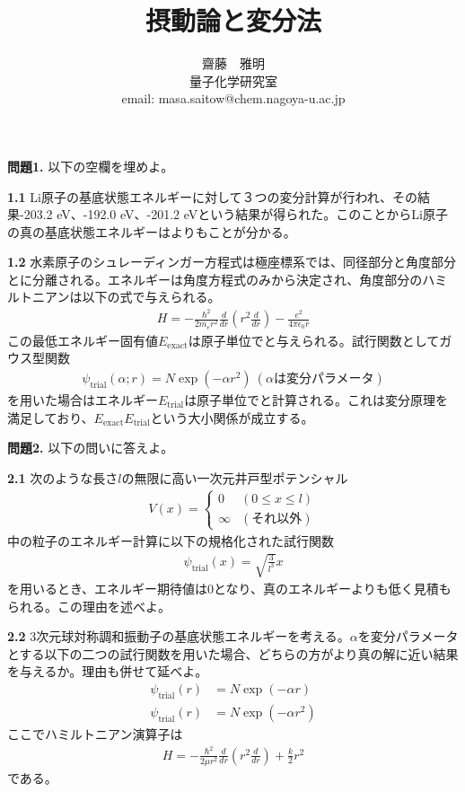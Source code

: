 \documentclass[11pt,pra,aps]{revtex4}
\newcommand{\boxz}[1]{\boxed{\phantom{\text{#1}}}}
\begin{document}
\title{摂動論と変分法}
\author{齋藤　雅明 \\ 量子化学研究室 \\ email: masa.saitow@chem.nagoya-u.ac.jp}

\maketitle

\noindent
{\bf 問題1.} 以下の空欄を埋めよ。

\noindent
{\bf 1.1} Li原子の基底状態エネルギーに対して３つの変分計算が行われ、その結果-203.2 eV、-192.0 eV、-201.2 eVという結果が得られた。このことからLi原子の真の基底状態エネルギーは\boxz{-203.2 eV}よりも\boxz{低い}ことが分かる。

\noindent
{\bf 1.2} 水素原子のシュレーディンガー方程式は極座標系では、同径部分と角度部分とに分離される。エネルギーは角度方程式のみから決定され、角度部分のハミルトニアンは以下の式で与えられる。
\begin{align}
  H = -\frac{\hbar^2}{2m_e r^2}\frac{d}{dr}\left(r^2\frac{d}{dr}\right)-\frac{e^2}{4\pi\epsilon_0 r}
\end{align}
この最低エネルギー固有値$E_\text{exact}$は原子単位で\boxz{-0.5}と与えられる。試行関数としてガウス型関数
\begin{align}
  \psi_\text{trial}(\alpha;r)=N\exp\left(-\alpha r^2\right) \ (\alpha\text{は変分パラメータ})
\end{align}
を用いた場合はエネルギー$E_\text{trial}$は原子単位で\boxz{}と計算される。これは変分原理を満足しており、$E_\text{exact}$\boxz{$\leq$}$E_\text{trial}$という大小関係が成立する。

\noindent
{\bf 問題2.} 以下の問いに答えよ。

\noindent
{\bf 2.1} 次のような長さ$l$の無限に高い一次元井戸型ポテンシャル
\begin{align}
  V(x)=\left\{
  \begin{array}{cc}
    0 & (0 \leq x \leq l) \\
    \infty & (\text{それ以外})
  \end{array}
  \right.
\end{align}
中の粒子のエネルギー計算に以下の規格化された試行関数
\begin{align}
  \psi_\text{trial}(x) = \sqrt{\frac{3}{l^3}}x
\end{align}
を用いるとき、エネルギー期待値は0となり、真のエネルギーよりも低く見積もられる。この理由を述べよ。

\noindent
{\bf 2.2} 3次元球対称調和振動子の基底状態エネルギーを考える。$\alpha$を変分パラメータとする以下の二つの試行関数を用いた場合、どちらの方がより真の解に近い結果を与えるか。理由も併せて延べよ。
\begin{align}
  \psi_\text{trial}(r)&=N\exp\left(-\alpha r\right) \\
  \psi_\text{trial}(r)&=N\exp\left(-\alpha r^2\right)
\end{align}
ここでハミルトニアン演算子は
\begin{align}
  H=-\frac{\hbar^2}{2\mu r^2}\frac{d}{dr}\left(r^2\frac{d}{dr}\right)+\frac{k}{2}r^2
\end{align}
である。
\end{document}
